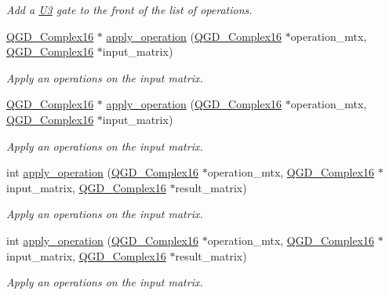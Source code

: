 \begin{DoxyCompactItemize}
\begin{DoxyCompactList}\small\item\em Add a \hyperlink{class_u3}{U3} gate to the front of the list of operations. \end{DoxyCompactList}\item 
\hyperlink{struct_q_g_d___complex16}{Q\+G\+D\+\_\+\+Complex16} $\ast$ \hyperlink{class_decomposition___base_a07d2b71ccdf4925377ee18bc552bb257}{apply\+\_\+operation} (\hyperlink{struct_q_g_d___complex16}{Q\+G\+D\+\_\+\+Complex16} $\ast$operation\+\_\+mtx, \hyperlink{struct_q_g_d___complex16}{Q\+G\+D\+\_\+\+Complex16} $\ast$input\+\_\+matrix)
\begin{DoxyCompactList}\small\item\em Apply an operations on the input matrix. \end{DoxyCompactList}\item 
\hyperlink{struct_q_g_d___complex16}{Q\+G\+D\+\_\+\+Complex16} $\ast$ \hyperlink{class_decomposition___base_a4963d3fe033c225eb19a0e6f271ef37a}{apply\+\_\+operation} (\hyperlink{struct_q_g_d___complex16}{Q\+G\+D\+\_\+\+Complex16} $\ast$operation\+\_\+mtx, \hyperlink{struct_q_g_d___complex16}{Q\+G\+D\+\_\+\+Complex16} $\ast$input\+\_\+matrix)
\begin{DoxyCompactList}\small\item\em Apply an operations on the input matrix. \end{DoxyCompactList}\item 
int \hyperlink{class_decomposition___base_aa6d12ac493c26af71613bc570fb87858}{apply\+\_\+operation} (\hyperlink{struct_q_g_d___complex16}{Q\+G\+D\+\_\+\+Complex16} $\ast$operation\+\_\+mtx, \hyperlink{struct_q_g_d___complex16}{Q\+G\+D\+\_\+\+Complex16} $\ast$input\+\_\+matrix, \hyperlink{struct_q_g_d___complex16}{Q\+G\+D\+\_\+\+Complex16} $\ast$result\+\_\+matrix)
\begin{DoxyCompactList}\small\item\em Apply an operations on the input matrix. \end{DoxyCompactList}\item 
int \hyperlink{class_decomposition___base_aa6d12ac493c26af71613bc570fb87858}{apply\+\_\+operation} (\hyperlink{struct_q_g_d___complex16}{Q\+G\+D\+\_\+\+Complex16} $\ast$operation\+\_\+mtx, \hyperlink{struct_q_g_d___complex16}{Q\+G\+D\+\_\+\+Complex16} $\ast$input\+\_\+matrix, \hyperlink{struct_q_g_d___complex16}{Q\+G\+D\+\_\+\+Complex16} $\ast$result\+\_\+matrix)
\begin{DoxyCompactList}\small\item\em Apply an operations on the input matrix. \end{DoxyCompactList}\item 

\end{DoxyCompactItemize}
